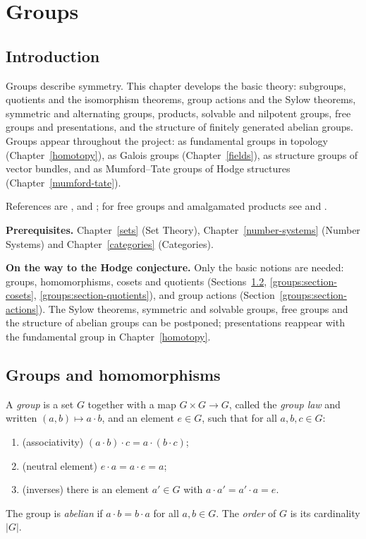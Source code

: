 \chapter{Groups}\label{groups}

\section{Introduction}\label{groups:section-introduction}

Groups describe symmetry. This chapter develops the basic theory: subgroups,
quotients and the isomorphism theorems, group actions and the Sylow theorems,
symmetric and alternating groups, products, solvable and nilpotent groups,
free groups and presentations, and the structure of finitely generated
abelian groups. Groups appear throughout the project: as fundamental groups
in topology (Chapter~\ref{homotopy}), as Galois groups
(Chapter~\ref{fields}), as structure groups of vector bundles, and as
Mumford--Tate groups of Hodge structures (Chapter~\ref{mumford-tate}).

References are \cite{lang-algebra}, \cite{rotman-groups} and
\cite{dummit-foote}; for free groups and amalgamated products see
\cite{serre-trees} and \cite{lyndon-schupp}.

\noindent\textbf{Prerequisites.} Chapter~\ref{sets} (Set Theory),
Chapter~\ref{number-systems} (Number Systems) and Chapter~\ref{categories}
(Categories).

\noindent\textbf{On the way to the Hodge conjecture.} Only the basic notions are needed: groups, homomorphisms, cosets and quotients (Sections~\ref{groups:section-groups}, \ref{groups:section-cosets}, \ref{groups:section-quotients}), and group actions
(Section~\ref{groups:section-actions}). The Sylow theorems, symmetric and solvable groups, free groups and the structure of abelian groups can be postponed; presentations reappear with the
fundamental group in Chapter~\ref{homotopy}.

\section{Groups and homomorphisms}\label{groups:section-groups}

\begin{definition}\label{groups:definition-group}
A \emph{group} is a set $G$ together with a map $G \times G \to G$, called the
\emph{group law} and written $(a, b) \mapsto a \cdot b$, and an element $e \in G$, such that
for all $a, b, c \in G$:
\begin{enumerate}
\item (associativity) $(a \cdot b) \cdot c = a \cdot (b \cdot c)$;
\item (neutral element) $e \cdot a = a \cdot e = a$;
\item (inverses) there is an element $a' \in G$ with $a \cdot a' = a' \cdot a = e$.
\end{enumerate}
The group is \emph{abelian} if $a \cdot b = b \cdot a$ for all $a, b \in G$. The \emph{order}
of $G$ is its cardinality $|G|$.
\end{definition}

